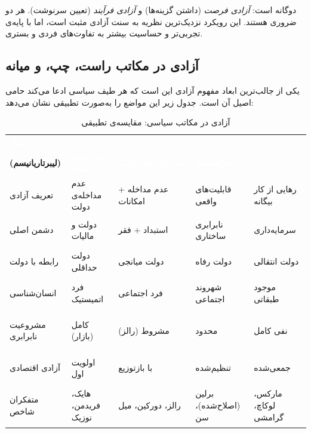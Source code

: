  دوگانه است: \textit{آزادی فرصت} (داشتن گزینه‌ها) و \textit{آزادی فرآیند} (تعیین سرنوشت). هر دو ضروری هستند. این رویکرد نزدیک‌ترین نظریه به سنت آزادی مثبت است، اما با پایه‌ی تجربی‌تر و حساسیت بیشتر به تفاوت‌های فردی و بستری.

\subsection{آزادی در مکاتب راست، چپ، و میانه}
\label{subsec:leftright}

یکی از جالب‌ترین ابعاد مفهوم آزادی این است که هر طیف سیاسی ادعا می‌کند حامی اصیل آن است. جدول زیر این مواضع را به‌صورت تطبیقی نشان می‌دهد:

\begin{table}[h!]
\centering
\caption{آزادی در مکاتب سیاسی: مقایسه‌ی تطبیقی}
\label{tab:leftright}
\renewcommand{\arraystretch}{1.6}
\setlength{\tabcolsep}{5pt}

\begin{tabularx}{\textwidth}{|>{\bfseries}p{2.4cm}
  |>{\raggedright}X|>{\raggedright}X|>{\raggedright}X
  |>{\raggedright\arraybackslash}X|}
\hline
\rowcolor{PrimaryDeep}
\textcolor{white}{\textbf{معیار}} &
\textcolor{white}{\textbf{راست کلاسیک\\(لیبرتاریانیسم)}} &
\textcolor{white}{\textbf{لیبرالیسم میانه}} &
\textcolor{white}{\textbf{سوسیال‌دموکراسی}} &
\textcolor{white}{\textbf{مارکسیسم}} \\
\hline

\rowcolor{BgCool}
تعریف آزادی &
عدم مداخله‌ی دولت &
عدم مداخله + امکانات &
قابلیت‌های واقعی &
رهایی از کار بیگانه \\
\hline

\rowcolor{white}
دشمن اصلی &
دولت و مالیات &
استبداد + فقر &
نابرابری ساختاری &
سرمایه‌داری \\
\hline

\rowcolor{BgCool}
رابطه با دولت &
دولت حداقلی &
دولت میانجی &
دولت رفاه &
دولت انتقالی \\
\hline

\rowcolor{white}
انسان‌شناسی &
فرد اتمیستیک &
فرد اجتماعی &
شهروند اجتماعی &
موجود طبقاتی \\
\hline

\rowcolor{BgCool}
مشروعیت نابرابری &
کامل (بازار) &
مشروط (رالز) &
محدود &
نفی کامل \\
\hline

\rowcolor{white}
آزادی اقتصادی &
اولویت اول &
با بازتوزیع &
تنظیم‌شده &
جمعی‌شده \\
\hline

\rowcolor{BgCool}
متفکران شاخص &
هایک، فریدمن، نوزیک &
رالز، دورکین، میل &
برلین (اصلاح‌شده)، سن &
مارکس، لوکاچ، گرامشی \\
\hline

\end{tabularx}
\end{table}

